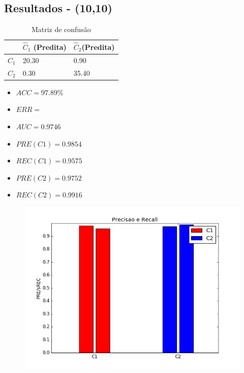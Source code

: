 \documentclass[11pt,a4paper]{article}
\numberwithin{equation}{section}
\begin{document}
\subsection{Resultados - (10,10)}
\begin{table}[H]
\centering
\caption{Matriz de confusão}
\begin{tabular}{l l l}
\hline
 & \textbf{$\hat{C}_1$ (Predita)} & \textbf{$\hat{C}_2$(Predita)}\\
\hline
$C_1$ & 20.30 & 0.90 \\
$C_2$ & 0.30  & 35.40\\ 
\hline
\end{tabular}
\end{table}

\begin{minipage}{.5\textwidth}
\begin{itemize}
\item $ACC = 97.89 \%$
\item $ERR =  $
\item $AUC = 0.9746  $
\item $PRE(C1) = 0.9854$
\item $REC(C1) = 0.9575$
\item $PRE(C2) = 0.9752$
\item $REC(C2) = 0.9916$
\end{itemize}
\end{minipage}%
\begin{minipage}{.5\textwidth}
\begin{figure}[H]
\centering
  \includegraphics[width=\linewidth]{../img/mlp_10x10.png}
  \label{fig:percep}
\end{figure}
\end{minipage}%
\end{document}

